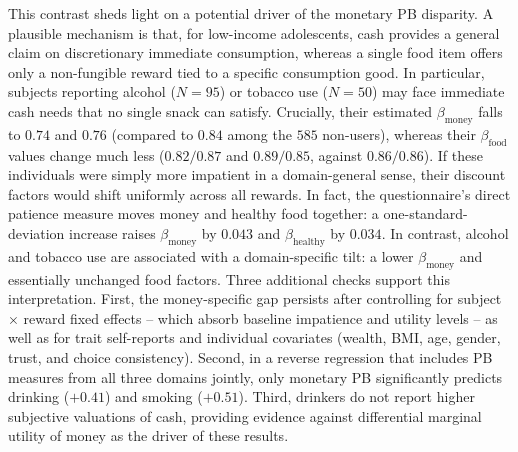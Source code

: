 \documentclass[11pt,a4paper]{article}
\theoremstyle{plain}
\theoremstyle{definition}
\begin{document}
\noindent
This contrast sheds light on a potential driver of the monetary PB disparity. 
A plausible mechanism is that, for low-income adolescents, cash provides a general claim on discretionary immediate consumption, whereas a single food item offers only a non-fungible reward tied to a specific consumption good.
In particular, subjects reporting alcohol ($N=95$) or tobacco use ($N=50$) may face immediate cash needs that no single snack can satisfy. Crucially, their estimated $\beta_{\text{money}}$ falls to $0.74$ and $0.76$ (compared to $0.84$ among the $585$ non-users), whereas their $\beta_{\text{food}}$ values change much less ($0.82/0.87$ and $0.89/0.85$, against $0.86/0.86$). %
If these individuals were simply more impatient in a domain-general sense, their discount factors would shift uniformly across all rewards. 
In fact, the questionnaire's direct patience measure moves money and healthy food together: a one-standard-deviation increase raises $\beta_{\text{money}}$ by $0.043$ and $\beta_{\text{healthy}}$ by $0.034$.
In contrast, alcohol and tobacco use are associated with a domain-specific tilt: a lower $\beta_{\text{money}}$ and essentially unchanged food factors.
Three additional checks support this interpretation. First, the money-specific gap persists after controlling for subject $\times$ reward fixed effects -- which absorb baseline impatience and utility levels -- as well as for trait self-reports and individual covariates (wealth, BMI, age, gender, trust, and choice consistency). Second, in a reverse regression that includes PB measures from all three domains jointly, only monetary PB significantly predicts drinking ($+0.41$) and smoking ($+0.51$). Third, drinkers do not report higher subjective valuations of cash, providing evidence against differential marginal utility of money as the driver of these results.

\end{document}
